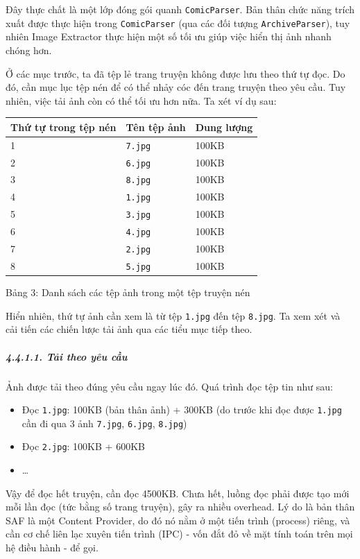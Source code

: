 \documentclass[
]{article}
\providecommand{\tightlist}{%
  \setlength{\itemsep}{0pt}\setlength{\parskip}{0pt}}
\begin{document}
Đây thực chất là một lớp đóng gói quanh \texttt{ComicParser}. Bản thân
chức năng trích xuất được thực hiện trong \texttt{ComicParser} (qua các
đối tượng \texttt{ArchiveParser}), tuy nhiên Image Extractor thực hiện
một số tối ưu giúp việc hiển thị ảnh nhanh chóng hơn.

Ở các mục trước, ta đã tệp lẻ trang truyện không được lưu theo thứ tự
đọc. Do đó, cần mục lục tệp nén để có thể nhảy cóc đến trang truyện theo
yêu cầu. Tuy nhiên, việc tải ảnh còn có thể tối ưu hơn nữa. Ta xét ví dụ
sau:

\begin{longtable}[]{@{}lll@{}}
\toprule
Thứ tự trong tệp nén & Tên tệp ảnh & Dung lượng \\
\midrule
\endhead
1 & \texttt{7.jpg} & 100KB \\
2 & \texttt{6.jpg} & 100KB \\
3 & \texttt{8.jpg} & 100KB \\
4 & \texttt{1.jpg} & 100KB \\
5 & \texttt{3.jpg} & 100KB \\
6 & \texttt{4.jpg} & 100KB \\
7 & \texttt{2.jpg} & 100KB \\
8 & \texttt{5.jpg} & 100KB \\
\bottomrule
\end{longtable}

Bảng 3: Danh sách các tệp ảnh trong một tệp truyện nén

Hiển nhiên, thứ tự ảnh cần xem là từ tệp \texttt{1.jpg} đến tệp
\texttt{8.jpg}. Ta xem xét và cải tiến các chiến lược tải ảnh qua các
tiểu mục tiếp theo.

\hypertarget{tux1ea3i-theo-yuxeau-cux1ea7u}{%
\subparagraph{4.4.1.1. Tải theo yêu
cầu}\label{tux1ea3i-theo-yuxeau-cux1ea7u}}

Ảnh được tải theo đúng yêu cầu ngay lúc đó. Quá trình đọc tệp tin như
sau:

\begin{itemize}
\tightlist
\item
  Đọc \texttt{1.jpg}: 100KB (bản thân ảnh) + 300KB (do trước khi đọc
  được \texttt{1.jpg} cần đi qua 3 ảnh \texttt{7.jpg}, \texttt{6.jpg},
  \texttt{8.jpg})
\item
  Đọc \texttt{2.jpg}: 100KB + 600KB
\item
  \ldots{}
\end{itemize}

Vậy để đọc hết truyện, cần đọc 4500KB. Chưa hết, luồng đọc phải được tạo
mới mỗi lần đọc (tức bằng số trang truyện), gây ra nhiều overhead. Lý do
là bản thân SAF là một Content Provider, do đó nó nằm ở một tiến trình
(process) riêng, và cần cơ chế liên lạc xuyên tiến trình (IPC) - vốn đắt
đỏ về mặt tính toán trên mọi hệ điều hành - để gọi.
\end{document}
